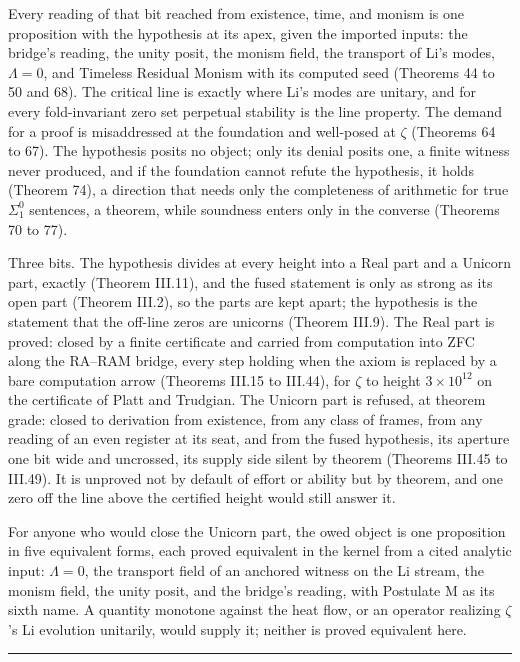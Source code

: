 \documentclass[10pt]{article}
\newcommand{\jboxstart}{\begin{jbox}}
\newenvironment{jbox}{\par\vspace{2pt}\noindent\color{accent}\rule{\columnwidth}{0.8pt}\par\vspace{-2pt}\small}{\par\vspace{2pt}}
\begin{document}
Every reading of that bit reached from existence, time, and monism is
one proposition with the hypothesis at its apex, given the imported
inputs: the bridge's reading, the unity posit, the monism field, the
transport of Li's modes, \(\Lambda = 0\), and Timeless Residual Monism
with its computed seed (Theorems 44 to 50 and 68). The critical line is
exactly where Li's modes are unitary, and for every fold-invariant zero
set perpetual stability is the line property. The demand for a proof is
misaddressed at the foundation and well-posed at \(\zeta\) (Theorems 64
to 67). The hypothesis posits no object; only its denial posits one, a
finite witness never produced, and if the foundation cannot refute the
hypothesis, it holds (Theorem 74), a direction that needs only the
completeness of arithmetic for true \(\Sigma^0_1\) sentences, a theorem,
while soundness enters only in the converse (Theorems 70 to 77).

Three bits. The hypothesis divides at every height into a Real part and
a Unicorn part, exactly (Theorem III.11), and the fused statement is
only as strong as its open part (Theorem III.2), so the parts are kept
apart; the hypothesis is the statement that the off-line zeros are
unicorns (Theorem III.9). The Real part is proved: closed by a finite
certificate and carried from computation into ZFC along the RA--RAM
bridge, every step holding when the axiom is replaced by a bare
computation arrow (Theorems III.15 to III.44), for \(\zeta\) to height
\(3 \times 10^{12}\) on the certificate of Platt and Trudgian. The
Unicorn part is refused, at theorem grade: closed to derivation from
existence, from any class of frames, from any reading of an even
register at its seat, and from the fused hypothesis, its aperture one
bit wide and uncrossed, its supply side silent by theorem (Theorems
III.45 to III.49). It is unproved not by default of effort or ability
but by theorem, and one zero off the line above the certified height
would still answer it.

For anyone who would close the Unicorn part, the owed object is one
proposition in five equivalent forms, each proved equivalent in the
kernel from a cited analytic input: \(\Lambda = 0\), the transport field
of an anchored witness on the Li stream, the monism field, the unity
posit, and the bridge's reading, with Postulate M as its sixth name. A
quantity monotone against the heat flow, or an operator realizing
\(\zeta\)'s Li evolution unitarily, would supply it; neither is proved
equivalent here.

\jboxstart
\end{document}

